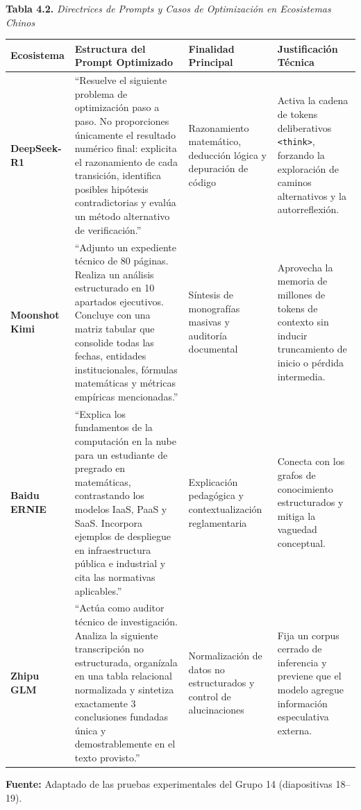 \begin{table}[htbp]
\centering
\small
\textbf{Tabla 4.2.} \textit{Directrices de Prompts y Casos de Optimización en Ecosistemas Chinos}\\[0.25cm]
\label{tab:prompts_ecosistemas_chinos}
\begin{tabularx}{\textwidth}{l p{5.5cm} p{3.2cm} X}
\toprule
\textbf{Ecosistema} & \textbf{Estructura del Prompt Optimizado} & \textbf{Finalidad Principal} & \textbf{Justificación Técnica} \\
\midrule
\textbf{DeepSeek-R1} & ``Resuelve el siguiente problema de optimización paso a paso. No proporciones únicamente el resultado numérico final: explicita el razonamiento de cada transición, identifica posibles hipótesis contradictorias y evalúa un método alternativo de verificación.'' & Razonamiento matemático, deducción lógica y depuración de código & Activa la cadena de tokens deliberativos \texttt{<think>}, forzando la exploración de caminos alternativos y la autorreflexión. \\
\addlinespace
\textbf{Moonshot Kimi} & ``Adjunto un expediente técnico de 80 páginas. Realiza un análisis estructurado en 10 apartados ejecutivos. Concluye con una matriz tabular que consolide todas las fechas, entidades institucionales, fórmulas matemáticas y métricas empíricas mencionadas.'' & Síntesis de monografías masivas y auditoría documental & Aprovecha la memoria de millones de tokens de contexto sin inducir truncamiento de inicio o pérdida intermedia. \\
\addlinespace
\textbf{Baidu ERNIE} & ``Explica los fundamentos de la computación en la nube para un estudiante de pregrado en matemáticas, contrastando los modelos IaaS, PaaS y SaaS. Incorpora ejemplos de despliegue en infraestructura pública e industrial y cita las normativas aplicables.'' & Explicación pedagógica y contextualización reglamentaria & Conecta con los grafos de conocimiento estructurados y mitiga la vaguedad conceptual. \\
\addlinespace
\textbf{Zhipu GLM} & ``Actúa como auditor técnico de investigación. Analiza la siguiente transcripción no estructurada, organízala en una tabla relacional normalizada y sintetiza exactamente 3 conclusiones fundadas única y demostrablemente en el texto provisto.'' & Normalización de datos no estructurados y control de alucinaciones & Fija un corpus cerrado de inferencia y previene que el modelo agregue información especulativa externa. \\
\bottomrule
\end{tabularx}
\begin{center}
\scriptsize \textbf{Fuente:} Adaptado de las pruebas experimentales del Grupo 14 (diapositivas 18--19).
\end{center}
\end{table}

